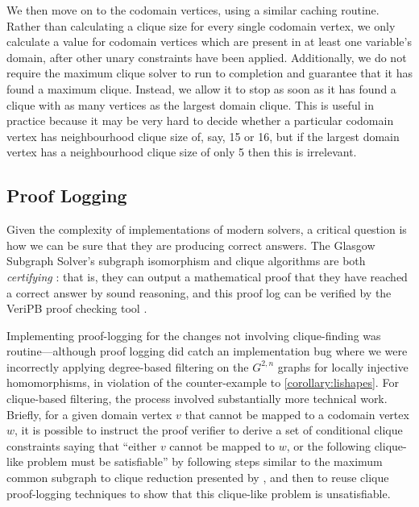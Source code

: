 \documentclass{article}
\newcommand{\citet}[1]{\citeauthor{#1} \shortcite{#1}}
\begin{document}
We then move on to the codomain vertices, using a similar caching routine. Rather than calculating a
clique size for every single codomain vertex, we only calculate a value for codomain vertices which are
present in at least one variable's domain, after other unary constraints have been applied.
Additionally, we do not require the maximum clique solver to run to completion and guarantee that it
has found a maximum clique. Instead, we allow it to stop as soon as it has found a clique with as
many vertices as the largest domain clique. This is useful in practice because it may be very hard
to decide whether a particular codomain vertex has neighbourhood clique size of, say, 15 or 16, but if
the largest domain vertex has a neighbourhood clique size of only 5 then this is irrelevant.

\subsection{Proof Logging}

Given the complexity of implementations of modern solvers, a critical question is how we can be sure
that they are producing correct answers. The Glasgow Subgraph Solver's subgraph isomorphism and
clique algorithms are both \emph{certifying} \cite{DBLP:journals/csr/McConnellMNS11}: that is, they
can output a mathematical proof that they have reached a correct answer by sound reasoning, and this
proof log can be verified by the VeriPB proof checking tool
\cite{DBLP:conf/cp/GochtMMNPT20,DBLP:conf/ijcai/GochtMN20}.

Implementing proof-logging for the changes not involving clique-finding was routine---although proof
logging did catch an implementation bug where we were incorrectly applying degree-based filtering on
the $G^{2,n}$ graphs for locally injective homomorphisms, in violation of the counter-example to
\cref{corollary:lishapes}. For clique-based filtering, the process involved substantially more
technical work. Briefly, for a given domain vertex $v$ that cannot be mapped to a codomain vertex
$w$, it is possible to instruct the proof verifier to derive a set of conditional clique constraints
saying that ``either $v$ cannot be mapped to $w$, or the following clique-like problem must be
satisfiable'' by following steps similar to the maximum common subgraph to clique reduction
presented by \citet{DBLP:conf/cp/GochtMMNPT20}, and then to reuse clique
proof-logging techniques to show that this clique-like problem is unsatisfiable.
\end{document}
